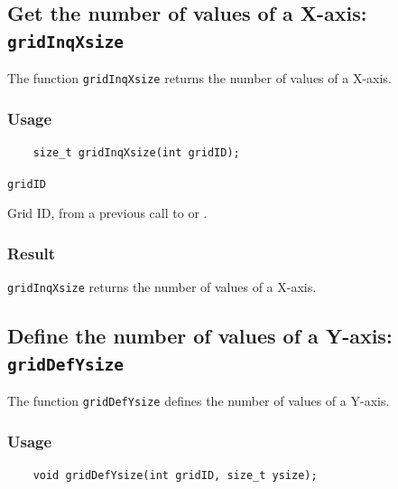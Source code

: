 \subsection{Get the number of values of a X-axis: \texttt{gridInqXsize}}
\label{gridInqXsize}

The function {\texttt{gridInqXsize}} returns the number of values of a X-axis.

\subsubsection*{Usage}

\begin{verbatim}
    size_t gridInqXsize(int gridID);
\end{verbatim}

\hspace*{4mm}\begin{minipage}[]{15cm}
\begin{deflist}{\texttt{gridID}\ }
\item[\texttt{gridID}]
Grid ID, from a previous call to {} or {}.

\end{deflist}
\end{minipage}

\subsubsection*{Result}

{\texttt{gridInqXsize}} returns the number of values of a X-axis.



\subsection{Define the number of values of a Y-axis: \texttt{gridDefYsize}}
\label{gridDefYsize}

The function {\texttt{gridDefYsize}} defines the number of values of a Y-axis.

\subsubsection*{Usage}

\begin{verbatim}
    void gridDefYsize(int gridID, size_t ysize);
\end{verbatim}

